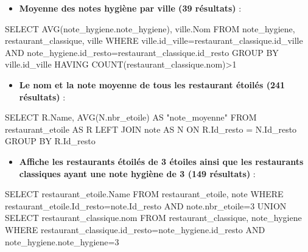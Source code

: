 \documentclass[mstat,12pt]{unswthesis}
\newenvironment{Shaded}{\begin{snugshade}}{\end{snugshade}}
\newcommand{\DecValTok}[1]{\textcolor[rgb]{0.00,0.00,0.81}{#1}}
\newcommand{\FunctionTok}[1]{\textcolor[rgb]{0.00,0.00,0.00}{#1}}
\newcommand{\NormalTok}[1]{#1}
\newcommand{\OtherTok}[1]{\textcolor[rgb]{0.56,0.35,0.01}{#1}}
\newcommand{\SpecialCharTok}[1]{\textcolor[rgb]{0.00,0.00,0.00}{#1}}
\newcommand{\StringTok}[1]{\textcolor[rgb]{0.31,0.60,0.02}{#1}}
\begin{document}
\medskip

\begin{itemize}
\tightlist
\item
  \textbf{Moyenne des notes hygiène par ville (39 résultats)} :
\end{itemize}

\begin{Shaded}
\begin{Highlighting}[]
\NormalTok{SELECT }\FunctionTok{AVG}\NormalTok{(note\_hygiene.note\_hygiene), ville.Nom }
\NormalTok{FROM note\_hygiene, restaurant\_classique, ville }
\NormalTok{WHERE ville.id\_ville}\OtherTok{=}\NormalTok{restaurant\_classique.id\_ville}
\NormalTok{AND note\_hygiene.id\_resto}\OtherTok{=}\NormalTok{restaurant\_classique.id\_resto}
\NormalTok{GROUP BY ville.id\_ville}
\NormalTok{HAVING }\FunctionTok{COUNT}\NormalTok{(restaurant\_classique.nom)}\SpecialCharTok{\textgreater{}}\DecValTok{1}
\end{Highlighting}
\end{Shaded}

\medskip

\begin{itemize}
\tightlist
\item
  \textbf{Le nom et la note moyenne de tous les restaurant étoilés (241
  résultats)} :
\end{itemize}

\begin{Shaded}
\begin{Highlighting}[]
\NormalTok{SELECT R.Name, }\FunctionTok{AVG}\NormalTok{(N.nbr\_etoile) AS }\StringTok{"note\_moyenne"}
\NormalTok{FROM restaurant\_etoile AS R}
\NormalTok{LEFT JOIN note AS N ON R.Id\_resto }\OtherTok{=}\NormalTok{ N.Id\_resto}
\NormalTok{GROUP BY R.Id\_resto}
\end{Highlighting}
\end{Shaded}

\medskip

\begin{itemize}
\tightlist
\item
  \textbf{Affiche les restaurants étoilés de 3 étoiles ainsi que les
  restaurants classiques ayant une note hygiène de 3 (149 résultats)} :
\end{itemize}

\begin{Shaded}
\begin{Highlighting}[]
\NormalTok{SELECT restaurant\_etoile.Name}
\NormalTok{FROM restaurant\_etoile, note}
\NormalTok{WHERE restaurant\_etoile.Id\_resto}\OtherTok{=}\NormalTok{note.Id\_resto}
\NormalTok{AND note.nbr\_etoile}\OtherTok{=}\DecValTok{3}
\NormalTok{UNION}
\NormalTok{SELECT restaurant\_classique.nom}
\NormalTok{FROM restaurant\_classique, note\_hygiene}
\NormalTok{WHERE restaurant\_classique.id\_resto}\OtherTok{=}\NormalTok{note\_hygiene.id\_resto}
\NormalTok{AND note\_hygiene.note\_hygiene}\OtherTok{=}\DecValTok{3}
\end{Highlighting}
\end{Shaded}
\end{document}
